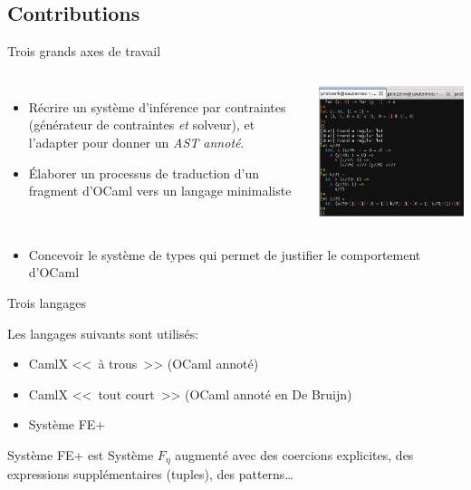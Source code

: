\documentclass[final]{beamer}
\begin{document}
\subsection{Contributions}

\begin{frame}{Trois grands axes de travail}
  \begin{columns}
      \begin{itemize}
        \item Récrire un système d'inférence par contraintes (générateur de
          contraintes \emph{et} solveur), et l'adapter pour
          donner un \emph{AST annoté}.
        \item Élaborer un processus de traduction d'un fragment d'OCaml vers un
          langage minimaliste
      \end{itemize}
      \includegraphics[width=\columnwidth]{screen1.png}
  \end{columns}
  \begin{itemize}
    \item Concevoir le système de types qui permet de justifier le comportement
      d'OCaml
  \end{itemize}
\end{frame}

\begin{frame}{Trois langages}

  Les langages suivants sont utilisés:
  \begin{itemize}
    \item CamlX <<~à trous~>> (OCaml annoté)
    \item CamlX <<~tout court~>> (OCaml annoté en De Bruijn)
    \item Système FE+
  \end{itemize}

  Système FE+ est Système $F_\eta$ augmenté avec des coercions explicites, des
  expressions supplémentaires (tuples), des patterns\dots
\end{frame}
\end{document}

